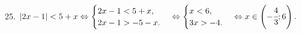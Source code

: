 25. $|2x-1|<5+x\Leftrightarrow\begin{cases}2x-1<5+x,\\ 2x-1>-5-x.\end{cases}
\Leftrightarrow\begin{cases}x<6,\\ 3x>-4.\end{cases}\Leftrightarrow x\in \left(-\cfrac{4}{3};6\right).$\\
